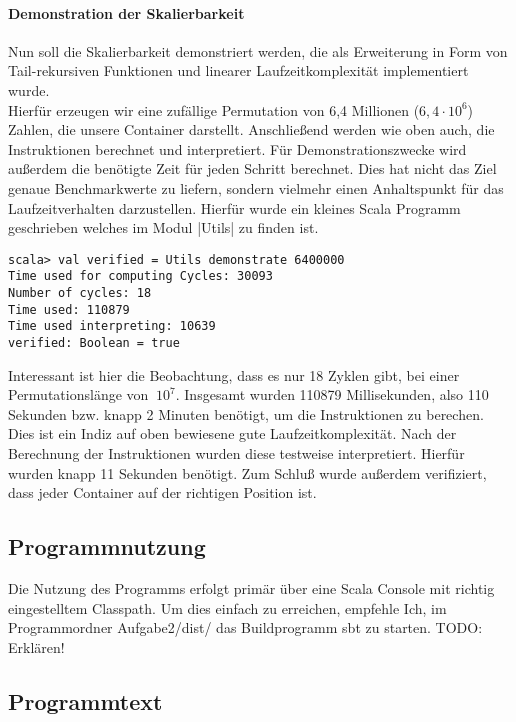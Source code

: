 \paragraph{Demonstration der Skalierbarkeit}
Nun soll die Skalierbarkeit demonstriert werden,
die als Erweiterung in Form von Tail-rekursiven Funktionen und linearer Laufzeitkomplexität implementiert wurde.\\
Hierfür erzeugen wir eine zufällige Permutation von 6,4 Millionen ($6,4 \cdot 10^6$) Zahlen, die unsere Container darstellt.
Anschließend werden wie oben auch, die Instruktionen berechnet und interpretiert.
Für Demonstrationszwecke wird außerdem die benötigte Zeit für jeden Schritt berechnet.
Dies hat nicht das Ziel genaue Benchmarkwerte zu liefern, sondern vielmehr einen Anhaltspunkt für das Laufzeitverhalten darzustellen.
Hierfür wurde ein kleines Scala Programm geschrieben welches im Modul |Utils| zu finden ist.
\begin{lstlisting}
scala> val verified = Utils demonstrate 6400000
Time used for computing Cycles: 30093
Number of cycles: 18
Time used: 110879
Time used interpreting: 10639
verified: Boolean = true
\end{lstlisting}
Interessant ist hier die Beobachtung, dass es nur 18 Zyklen gibt, bei einer Permutationslänge von $~10^7$.
Insgesamt wurden 110879 Millisekunden, also 110 Sekunden bzw. knapp 2 Minuten benötigt, um die Instruktionen zu berechen.
Dies ist ein Indiz auf oben bewiesene gute Laufzeitkomplexität.
Nach der Berechnung der Instruktionen wurden diese testweise interpretiert. Hierfür wurden knapp 11 Sekunden benötigt.
Zum Schluß wurde außerdem verifiziert, dass jeder Container auf der richtigen Position ist.

\subsection{Programmnutzung}
Die Nutzung des Programms erfolgt primär über eine Scala Console mit richtig eingestelltem Classpath.
Um dies einfach zu erreichen, empfehle Ich, im Programmordner Aufgabe2/dist/ das Buildprogramm sbt zu starten.
TODO: Erklären!
\subsection{Programmtext}
